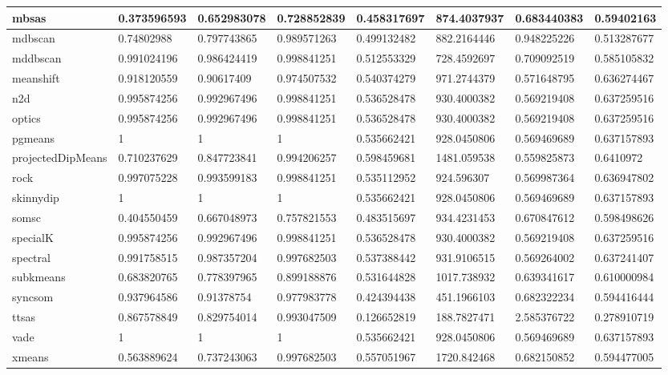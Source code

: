 \begin{table}[H]
\begin{tabular}{|l|l|l|l|l|l|l|l|}
\hline
mbsas & 0.373596593 & 0.652983078 & 0.728852839 & 0.458317697 & 874.4037937 & 0.683440383 & 0.59402163 \\
\hline
mdbscan & 0.74802988 & 0.797743865 & 0.989571263 & 0.499132482 & 882.2164446 & 0.948225226 & 0.513287677 \\
\hline
mddbscan & 0.991024196 & 0.986424419 & 0.998841251 & 0.512553329 & 728.4592697 & 0.709092519 & 0.585105832 \\
\hline
meanshift & 0.918120559 & 0.90617409 & 0.974507532 & 0.540374279 & 971.2744379 & 0.571648795 & 0.636274467 \\
\hline
n2d & 0.995874256 & 0.992967496 & 0.998841251 & 0.536528478 & 930.4000382 & 0.569219408 & 0.637259516 \\
\hline
optics & 0.995874256 & 0.992967496 & 0.998841251 & 0.536528478 & 930.4000382 & 0.569219408 & 0.637259516 \\
\hline
pgmeans & 1 & 1 & 1 & 0.535662421 & 928.0450806 & 0.569469689 & 0.637157893 \\
\hline
projectedDipMeans & 0.710237629 & 0.847723841 & 0.994206257 & 0.598459681 & 1481.059538 & 0.559825873 & 0.6410972 \\
\hline
rock & 0.997075228 & 0.993599183 & 0.998841251 & 0.535112952 & 924.596307 & 0.569987364 & 0.636947802 \\
\hline
skinnydip & 1 & 1 & 1 & 0.535662421 & 928.0450806 & 0.569469689 & 0.637157893 \\
\hline
somsc & 0.404550459 & 0.667048973 & 0.757821553 & 0.483515697 & 934.4231453 & 0.670847612 & 0.598498626 \\
\hline
specialK & 0.995874256 & 0.992967496 & 0.998841251 & 0.536528478 & 930.4000382 & 0.569219408 & 0.637259516 \\
\hline
spectral & 0.991758515 & 0.987357204 & 0.997682503 & 0.537388442 & 931.9106515 & 0.569264002 & 0.637241407 \\
\hline
subkmeans & 0.683820765 & 0.778397965 & 0.899188876 & 0.531644828 & 1017.738932 & 0.639341617 & 0.610000984 \\
\hline
syncsom & 0.937964586 & 0.91378754 & 0.977983778 & 0.424394438 & 451.1966103 & 0.682322234 & 0.594416444 \\
\hline
ttsas & 0.867578849 & 0.829754014 & 0.993047509 & 0.126652819 & 188.7827471 & 2.585376722 & 0.278910719 \\
\hline
vade & 1 & 1 & 1 & 0.535662421 & 928.0450806 & 0.569469689 & 0.637157893 \\
\hline
xmeans & 0.563889624 & 0.737243063 & 0.997682503 & 0.557051967 & 1720.842468 & 0.682150852 & 0.594477005 \\
\hline
\end{tabular}
\end{table}